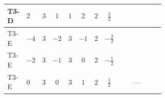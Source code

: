 \documentclass[8pt]{article}
\begin{document}
\begin{landscape}
\begin{longtable}{@{}llcccccc >{\raggedright\arraybackslash}p{0.21\linewidth} >{\raggedright\arraybackslash}p{0.21\linewidth} >{\raggedright\arraybackslash}p{0.21\linewidth}@{}}
T3-D & $2$ & $3$ & $1$ & $1$ & $2$ & $2$ & $\frac{3}{2}$ & \scriptsize\adjustbox{max width=\linewidth}{$\begin{gathered} -\frac{33 {g_2}^2 {\lambda_{HS_1}^{(1)}}}{2}\end{gathered}$} & \scriptsize\adjustbox{max width=\linewidth}{$\begin{gathered} +3 {g_1}^4\end{gathered}$} & \scriptsize\adjustbox{max width=\linewidth}{$\begin{gathered} -\frac{15 {g_1}^2 {\lambda_{HS_1}^{(1)}}}{2}\end{gathered}$} \\
\midrule
T3-E & $-4$ & $3$ & $-2$ & $3$ & $-1$ & $2$ & $-\frac{3}{2}$ & \scriptsize\adjustbox{max width=\linewidth}{$\begin{gathered} -\frac{33 {g_2}^2 {\lambda_{HS_1}^{(1)}}}{2}\end{gathered}$} & \scriptsize\adjustbox{max width=\linewidth}{$\begin{gathered} +12 {g_1}^4\end{gathered}$} & \scriptsize\adjustbox{max width=\linewidth}{$\begin{gathered} -\frac{51 {g_1}^2 {\lambda_{HS_1}^{(1)}}}{2}\end{gathered}$} \\
\midrule
T3-E & $-2$ & $3$ & $-1$ & $3$ & $0$ & $2$ & $-\frac{1}{2}$ & \scriptsize\adjustbox{max width=\linewidth}{$\begin{gathered} -\frac{33 {g_2}^2 {\lambda_{HS_1}^{(1)}}}{2}\end{gathered}$} & \scriptsize\adjustbox{max width=\linewidth}{$\begin{gathered} +3 {g_1}^4\end{gathered}$} & \scriptsize\adjustbox{max width=\linewidth}{$\begin{gathered} -\frac{15 {g_1}^2 {\lambda_{HS_1}^{(1)}}}{2}\end{gathered}$} \\
\midrule
T3-E & $0$ & $3$ & $0$ & $3$ & $1$ & $2$ & $\frac{1}{2}$ & \scriptsize\adjustbox{max width=\linewidth}{$\begin{gathered} -\frac{33 {g_2}^2 {\lambda_{HS_1}^{(1)}}}{2}\end{gathered}$} & --- & \scriptsize\adjustbox{max width=\linewidth}{$\begin{gathered} -\frac{3 {g_1}^2 {\lambda_{HS_1}^{(1)}}}{2}\end{gathered}$} \\
\midrule

\end{longtable}
\end{landscape}
\end{document}

